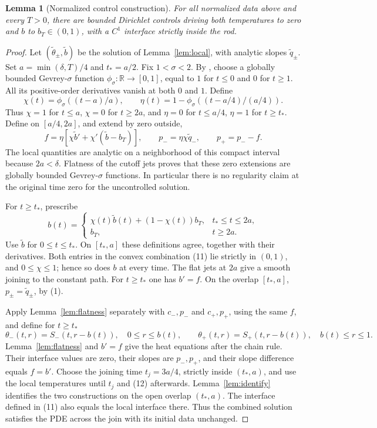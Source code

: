 \documentclass[11pt]{article}
\newtheorem{lemma}[theorem]{Lemma}
\begin{document}
\begin{lemma}[Normalized control construction]\label{lem:global}
For all normalized data above and every $T>0$, there are bounded
Dirichlet controls driving both temperatures to zero and $b$ to
$b_T\in(0,1)$, with a $C^1$ interface strictly inside the rod.
\end{lemma}
\begin{proof}
Let $(\widetilde\theta_\pm,\widetilde b)$ be the solution of Lemma~\ref{lem:local}, with
analytic slopes $\widetilde q_\pm$. Set
$a=\min(\delta,T)/4$ and $t_*=a/2$. Fix $1<\sigma<2$.
By \cite[Lemma 3.2]{CLT}, choose a globally bounded Gevrey-$\sigma$
function $\phi_\sigma:\mathbb R\to[0,1]$, equal to $1$ for $t\le0$
and $0$ for $t\ge1$. All its positive-order derivatives vanish at
both $0$ and $1$. Define
\[
 \chi(t)=\phi_\sigma((t-a)/a),\qquad
 \eta(t)=1-\phi_\sigma((t-a/4)/(a/4)).
\]
Thus $\chi=1$ for $t\le a$, $\chi=0$ for $t\ge2a$,
and $\eta=0$ for $t\le a/4$, $\eta=1$ for $t\ge t_*$.
Define on $[a/4,2a]$, and extend by zero outside,
\[
 f=\eta[\chi\widetilde b'+\chi'(\widetilde b-b_T)],\qquad
 p_-=\eta\chi\widetilde q_-,\qquad p_+=p_--f. \tag{10}
\]
The local quantities are analytic on a neighborhood of this compact
interval because $2a<\delta$. Flatness of the cutoff jets proves
that these zero extensions are globally bounded Gevrey-$\sigma$
functions. In particular there is no regularity claim at the original
time zero for the uncontrolled solution.

For $t\ge t_*$, prescribe
\[
 b(t)=\begin{cases}
 \chi(t)\widetilde b(t)+(1-\chi(t))b_T,&t_*\le t\le2a,\\
 b_T,&t\ge2a.
 \end{cases} \tag{11}
\]
Use $\widetilde b$ for $0\le t\le t_*$.
On $[t_*,a]$ these definitions agree, together with their derivatives.
Both entries in the convex combination (11) lie strictly in $(0,1)$,
and $0\le\chi\le1$; hence so does $b$ at every time.
The flat jets at $2a$ give a smooth joining to the constant path.
For $t\ge t_*$ one has $b'=f$. On the overlap $[t_*,a]$,
$p_\pm=\widetilde q_\pm$, by (1).

Apply Lemma~\ref{lem:flatness} separately with $c_-,p_-$ and $c_+,p_+$, using the same $f$,
and define for $t\ge t_*$
\[
 \theta_-(t,r)=S_-(t,r-b(t)),\quad 0\le r\le b(t),
 \qquad
 \theta_+(t,r)=S_+(t,r-b(t)),\quad b(t)\le r\le1. \tag{12}
\]
Lemma~\ref{lem:flatness} and $b'=f$ give the heat equations after the chain rule.
Their interface values are zero, their slopes are $p_-,p_+$,
and their slope difference equals $f=b'$. Choose the joining time
$t_j=3a/4$, strictly inside $(t_*,a)$, and use the local temperatures
until $t_j$ and (12) afterwards. Lemma~\ref{lem:identify} identifies the two constructions
on the open overlap $(t_*,a)$. The interface defined in (11) also
equals the local interface there. Thus the combined solution satisfies the PDE
across the join with its initial data unchanged.


\end{proof}
\end{document}
